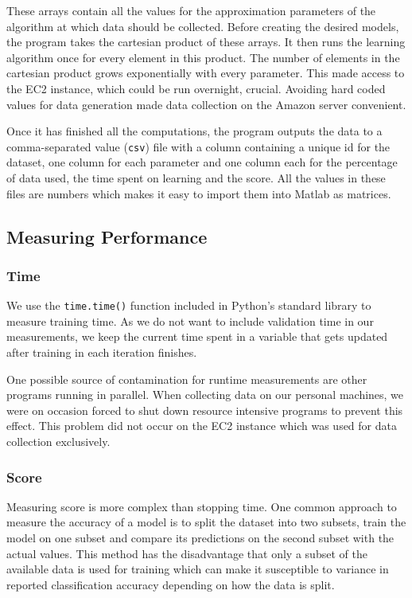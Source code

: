 \documentclass[a4paper,12pt,twoside,openright]{report}
\begin{document}

These arrays contain all the values for the approximation parameters of the algorithm at which data should be collected. Before creating the desired models, the program takes the cartesian product of these arrays. It then runs the learning algorithm once for every element in this product. The number of elements in the cartesian product grows exponentially with every parameter. This made access to the EC2 instance, which could be run overnight, crucial. Avoiding hard coded values for data generation made data collection on the Amazon server convenient.

Once it has finished all the computations, the program outputs the data to a comma-separated value (\texttt{csv}) file with a column containing a unique id for the dataset, one column for each parameter and one column each for the percentage of data used, the time spent on learning and the score. All the values in these files are numbers which makes it easy to import them into Matlab as matrices. 



\subsection{Measuring Performance}

\subsubsection{Time}
We use the \texttt{time.time()} function included in Python's standard library to measure training time. As we do not want to include validation time in our measurements, we keep the current time spent in a variable that gets updated after training in each iteration finishes.

One possible source of contamination for runtime measurements are other programs running in parallel. When collecting data on our personal machines, we were on occasion forced to shut down resource intensive programs to prevent this effect. This problem did not occur on the EC2 instance which was used for data collection exclusively.

\subsubsection{Score}

Measuring score is more complex than stopping time. One common approach to measure the accuracy of a model is to split the dataset into two subsets, train the model on one subset and compare its predictions on the second subset with the actual values. This method has the disadvantage that only a subset of the available data is used for training which can make it susceptible to variance in reported classification accuracy depending on how the data is split.
\end{document}
